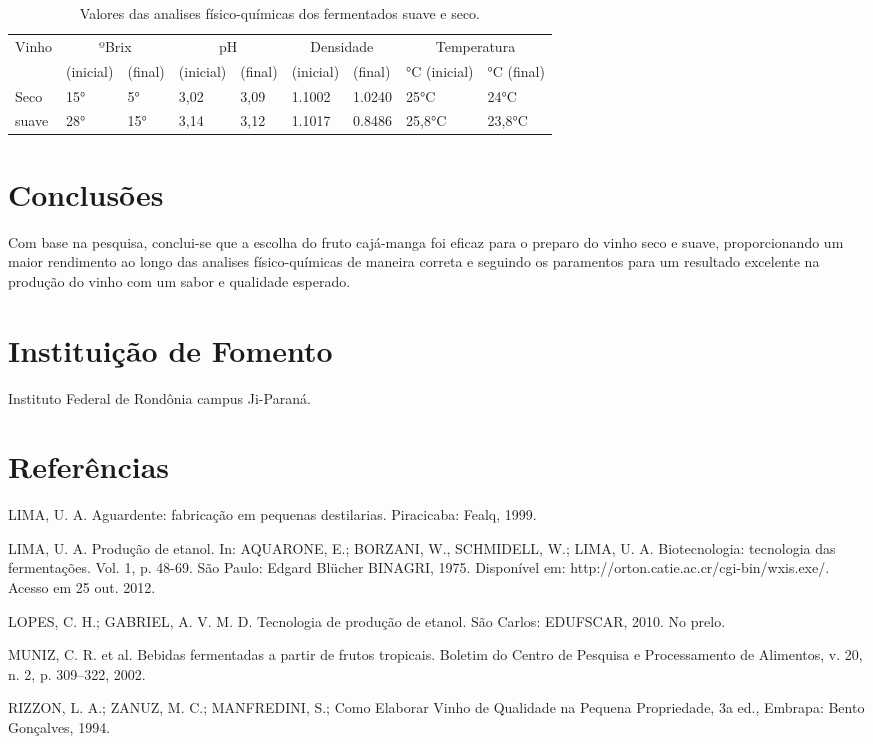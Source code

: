 \documentclass[article,12pt,onesidea,4paper,english,brazil]{abntex2}
\begin{document}
\begin{table}[h]
	\centering
	\caption{Valores das analises físico-químicas dos fermentados suave e seco.}
	\label{my-label}
	\begin{tabular}{|l|l|l|l|l|l|l|l|l|}
		\hline
		\multirow{2}{*}{Vinho} & \multicolumn{2}{c|}{ºBrix} & \multicolumn{2}{c|}{pH} & \multicolumn{2}{c|}{Densidade} & \multicolumn{2}{c|}{Temperatura} \\ \cline{2-9} 
		& (inicial)     & (final)    & (inicial)   & (final)   & (inicial)       & (final)      & °C (inicial)     & °C (final)    \\ \hline
		Seco                   & 15°           & 5°         & 3,02        & 3,09      & 1.1002          & 1.0240       & 25°C             & 24°C          \\ \hline
		suave                  & 28°           & 15°        & 3,14        & 3,12      & 1.1017          & 0.8486       & 25,8°C           & 23,8°C        \\ \hline
	\end{tabular}
\end{table}

	
	\section*{Conclusões}
	
Com base na pesquisa, conclui-se que a escolha do fruto cajá-manga foi eficaz para o preparo do vinho seco e suave, proporcionando um maior rendimento ao longo das analises físico-químicas de maneira correta e seguindo os paramentos para um resultado excelente na produção do vinho com um sabor e qualidade esperado.
	
	\section*{Instituição de Fomento}
	
	Instituto Federal de Rondônia campus Ji-Paraná.
	
	\section*{Referências}
	
	\sloppy
	
\noindent LIMA, U. A. Aguardente: fabricação em pequenas destilarias. Piracicaba: Fealq, 1999.

\noindent LIMA, U. A. Produção de etanol. In: AQUARONE, E.; BORZANI, W., SCHMIDELL,
W.; LIMA, U. A. Biotecnologia: tecnologia das fermentações. Vol. 1, p. 48-69. São Paulo: Edgard Blücher BINAGRI, 1975. Disponível em: http://orton.catie.ac.cr/cgi-bin/wxis.exe/. Acesso em 25 out. 2012.

\noindent LOPES, C. H.; GABRIEL, A. V. M. D. Tecnologia de produção de etanol. São Carlos: EDUFSCAR, 2010. No prelo.

\noindent MUNIZ, C. R. et al. Bebidas fermentadas a partir de frutos tropicais. Boletim do Centro de Pesquisa e Processamento de Alimentos, v. 20, n. 2, p. 309–322, 2002.

\noindent RIZZON, L. A.; ZANUZ, M. C.; MANFREDINI, S.; Como Elaborar Vinho de Qualidade na Pequena Propriedade, 3a ed., Embrapa: Bento Gonçalves, 1994.
	
\end{document}

